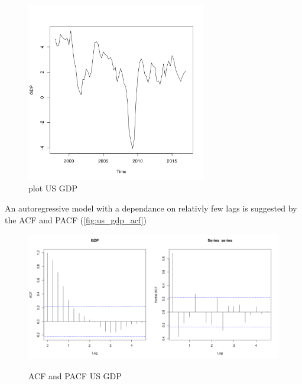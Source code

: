 \documentclass[10pt]{article}
\begin{document}
\begin{figure}[h!]
\centering
\includegraphics[width = 0.7\textwidth]{../plots/us_GDP}
\caption{plot US GDP}
\label{fig:us_gdp}
\end{figure}

An autoregressive model with a dependance on relativly few lags is suggested by the ACF and PACF (\autoref{fig:us_gdp_acf})

\begin{figure}[h!]
\centering
\includegraphics[width = 0.5\textwidth]{../acf/us_GDP}\includegraphics[width = 0.5\textwidth]{../pacf/us_GDP}
\caption{ACF and PACF US GDP}
\label{fig:us_gdp_acf}
\end{figure}
\end{document}

